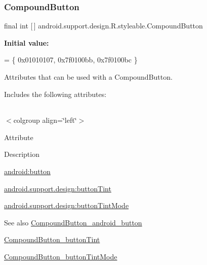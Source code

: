 \subsubsection{\texorpdfstring{Compound\+Button}{CompoundButton}}
{\footnotesize\ttfamily final int \mbox{[}$\,$\mbox{]} android.\+support.\+design.\+R.\+styleable.\+Compound\+Button\hspace{0.3cm}{\ttfamily [static]}}

{\bfseries Initial value\+:}
\begin{DoxyCode}
= \{
            0x01010107, 0x7f0100bb, 0x7f0100bc
        \}
\end{DoxyCode}
Attributes that can be used with a Compound\+Button. 

Includes the following attributes\+:

\tabulinesep=1mm
\begin{longtabu} spread 0pt [c]{*{0}{|X[-1]}|}
\hline
\end{longtabu}
$<$colgroup align=\char`\"{}left\char`\"{}$>$ 

Attribute

Description 

{\ttfamily \hyperlink{classandroid_1_1support_1_1design_1_1R_1_1styleable_a7c86b766680036719cc2fc26e73455d2}{android\+:button}}

{\ttfamily \hyperlink{classandroid_1_1support_1_1design_1_1R_1_1styleable_adb51f0ae98fba003b81f70cc31d6d226}{android.\+support.\+design\+:button\+Tint}}

{\ttfamily \hyperlink{classandroid_1_1support_1_1design_1_1R_1_1styleable_a61a4f9064091d383cddade36d380b0b7}{android.\+support.\+design\+:button\+Tint\+Mode}}

\begin{DoxySeeAlso}{See also}
\hyperlink{classandroid_1_1support_1_1design_1_1R_1_1styleable_a7c86b766680036719cc2fc26e73455d2}{Compound\+Button\+\_\+android\+\_\+button} 

\hyperlink{classandroid_1_1support_1_1design_1_1R_1_1styleable_adb51f0ae98fba003b81f70cc31d6d226}{Compound\+Button\+\_\+button\+Tint} 

\hyperlink{classandroid_1_1support_1_1design_1_1R_1_1styleable_a61a4f9064091d383cddade36d380b0b7}{Compound\+Button\+\_\+button\+Tint\+Mode} 
\end{DoxySeeAlso}
\mbox{\label{classandroid_1_1support_1_1design_1_1R_1_1styleable_a7c86b766680036719cc2fc26e73455d2}} 

